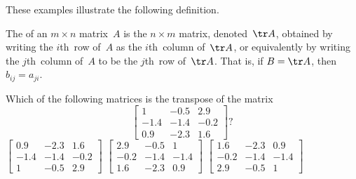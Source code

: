 These examples illustrate the following definition. 
\begin{definition}[transpose] \label{def:mattran}
The  of an \(m\times n\) matrix~\(A\) is the \(n\times m\) matrix, denoted~\(\tr A\), obtained by writing the \(i\)th~row of~\(A\) as the \(i\)th~column of~\(\tr A\), or equivalently by writing the \(j\)th~column of~\(A\) to be the \(j\)th~row of~\(\tr A\).
That is, if \(B=\tr A\), then \(b_{ij}=a_{ji}\).
\end{definition}



\begin{activity}
Which of the following matrices is the transpose of the matrix
\begin{equation*}
\begin{bmatrix} 1&-0.5&2.9
\\-1.4&-1.4&-0.2
\\0.9&-2.3&1.6 \end{bmatrix}?
\end{equation*}
{\(\begin{bmatrix} 0.9&-2.3&1.6
\\-1.4&-1.4&-0.2
\\1&-0.5&2.9 \end{bmatrix}\)}
{\(\begin{bmatrix} 2.9&-0.5&1
\\-0.2&-1.4&-1.4
\\1.6&-2.3&0.9 \end{bmatrix}\)}
{\(\begin{bmatrix} 1.6&-2.3&0.9
\\-0.2&-1.4&-1.4
\\2.9&-0.5&1 \end{bmatrix}\)}
\end{activity} 
